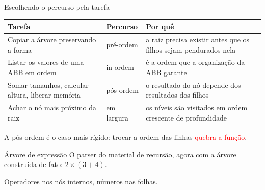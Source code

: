 \documentclass{beamer}
\newcommand{\tcr}[1]{\textcolor{red}{#1}}
\begin{document}
\begin{frame}{Escolhendo o percurso pela tarefa}
  \small
  \begin{center}
    \begin{tabular}{p{3.6cm}p{2cm}p{4.4cm}}
      \toprule
      \textbf{Tarefa}                                  & \textbf{Percurso} & \textbf{Por quê}                                                  \\
      \midrule
      Copiar a árvore preservando a forma              & pré-ordem         & a raiz precisa existir antes que os filhos sejam pendurados nela  \\
      Listar os valores de uma ABB em ordem            & in-ordem          & é a ordem que a organização da ABB garante                        \\
      Somar tamanhos, calcular altura, liberar memória & pós-ordem         & o resultado do nó depende dos resultados dos filhos               \\
      Achar o nó mais próximo da raiz                  & em largura        & os níveis são visitados em ordem crescente de profundidade        \\
      \bottomrule
    \end{tabular}
  \end{center}

  \vspace{0.3cm}
  A pós-ordem é o caso mais rígido: trocar a ordem das linhas
  \tcr{quebra a função}.
\end{frame}

\begin{frame}{Árvore de expressão}
  O parser do material de recursão, agora com a árvore construída de fato:
  $2 \times (3 + 4)$.

  \vspace{0.4cm}
  \begin{center}
  \end{center}

  \vspace{0.3cm}
  Operadores nos nós internos, números nas folhas.
\end{frame}
\end{document}
